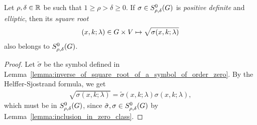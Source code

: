 \begin{corollary}
\label{corollary:square_root_of_a_symbol_of_order_zero}
    Let $\rho, \delta \in \mathbb{R}$ be such that $1 \geq \rho > \delta \geq 0$.
    If $\sigma \in S^{0}_{\rho, \delta}(G)$ is \emph{positive definite} and \emph{elliptic},
    then its \emph{square root}
    \begin{align*}
        (x, k; \lambda) \in G \times V \mapsto \sqrt{\sigma(x, k; \lambda)}
    \end{align*}
    also belongs to $S^{0}_{\rho, \delta}(G)$.
\end{corollary}
\begin{proof}
    Let $\tilde \sigma$ be the symbol defined in Lemma~\ref{lemma:inverse_of_square_root_of_a_symbol_of_order_zero}.
    By the Helffer-Sjostrand formula,
    we get
    \begin{align*}
        \sqrt{\sigma(x, k; \lambda)} = \tilde \sigma(x, k; \lambda) \sigma(x, k; \lambda),
    \end{align*}
    which must be in $S^{0}_{\rho, \delta}(G)$,
    since $\tilde \sigma, \sigma \in S^{0}_{\rho, \delta}(G)$ by Lemma~\ref{lemma:inclusion_in_zero_class}.
\end{proof}

